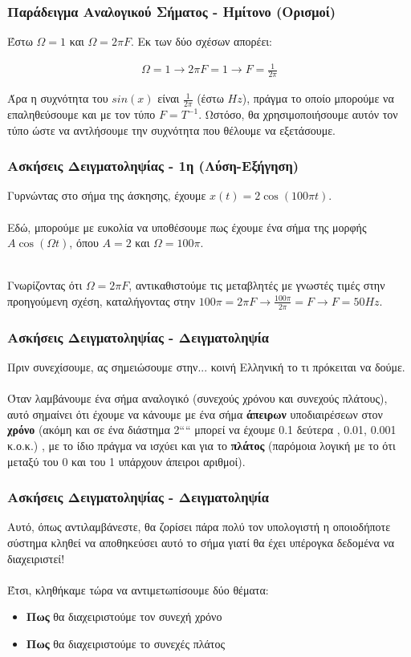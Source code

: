 \documentclass{beamer}
\begin{document}
\begin{frame}
	\frametitle{Παράδειγμα Αναλογικού Σήματος - Ημίτονο (Ορισμοί)}
	Έστω $\Omega = 1$ και $\Omega = 2 \pi F$. Εκ των δύο σχέσων απορέει: \pause
	\begin{center}
		\begin{align*}
			\Omega = 1 \rightarrow 2\pi F = 1 \rightarrow F = \frac{1}{2\pi}  
		\end{align*}
	\end{center}
	Άρα η συχνότητα του $sin(x)$ είναι $\frac{1}{2\pi}$ (έστω $Hz$), πράγμα το οποίο μπορούμε να επαληθεύσουμε και με τον τύπο $F=T^{-1}$. Ωστόσο, θα χρησιμοποιήσουμε αυτόν τον τύπο ώστε να αντλήσουμε την συχνότητα που θέλουμε να εξετάσουμε.
\end{frame}

\begin{frame}
	\frametitle{Ασκήσεις Δειγματοληψίας - 1η (Λύση-Εξήγηση)}
	Γυρνώντας στο σήμα της άσκησης, έχουμε $x(t) = 2\cos(100\pi t)$.  \\~\\ Εδώ, μπορούμε με ευκολία να υποθέσουμε πως έχουμε ένα σήμα της μορφής $A\cos(\Omega t)$, όπου $A = 2$ και $\Omega = 100\pi$. \\~\\
	\pause
	
	Γνωρίζοντας ότι $\Omega = 2\pi F$, αντικαθιστούμε τις μεταβλητές με γνωστές τιμές στην προηγούμενη σχέση, καταλήγοντας στην $100\pi = 2\pi F \rightarrow \frac{100\pi}{2\pi} = F \rightarrow F = 50Hz$.
\end{frame}

\begin{frame}
		\frametitle{Ασκήσεις Δειγματοληψίας - Δειγματοληψία}
		Πριν συνεχίσουμε, ας σημειώσουμε στην... κοινή Ελληνική το τι πρόκειται να δούμε. \\~\\
		Όταν λαμβάνουμε ένα σήμα αναλογικό (συνεχούς χρόνου και συνεχούς πλάτους), αυτό σημαίνει ότι έχουμε να κάνουμε με ένα σήμα \alert{\textbf{άπειρων}} υποδιαιρέσεων στον \textbf{χρόνο} (ακόμη και σε ένα διάστημα 2```` μπορεί να έχουμε 0.1 δεύτερα , 0.01, 0.001 κ.ο.κ.) , με το ίδιο πράγμα να ισχύει και για το \textbf{πλάτος} (παρόμοια λογική με το ότι μεταξύ του 0 και του 1 υπάρχουν άπειροι αριθμοί).
\end{frame}

\begin{frame}
	\frametitle{Ασκήσεις Δειγματοληψίας - Δειγματοληψία}
	Αυτό, όπως αντιλαμβάνεστε, θα ζορίσει πάρα πολύ τον υπολογιστή η οποιοδήποτε σύστημα κληθεί να αποθηκεύσει αυτό το σήμα γιατί θα έχει υπέρογκα δεδομένα να διαχειριστεί! \\~\\
	Έτσι, κληθήκαμε τώρα να αντιμετωπίσουμε δύο θέματα:
	\begin{itemize}
		\item 	\textbf{Πως} θα διαχειριστούμε τον συνεχή χρόνο \pause
		\item \textbf{Πως} θα διαχειριστούμε το συνεχές πλάτος
	\end{itemize}

\end{frame}
\end{document}

